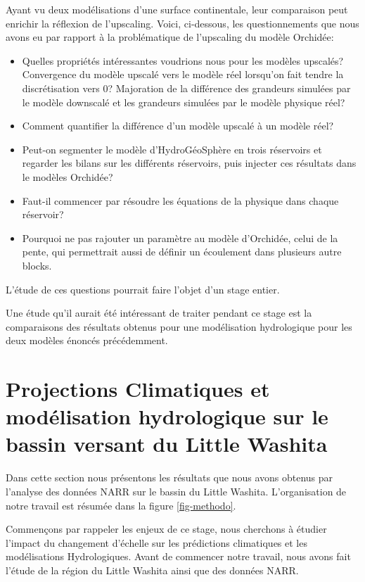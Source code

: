 \documentclass[a4paper,11pt]{article}
\numberwithin{equation}{section}
\begin{document}
Ayant vu deux modélisations d'une surface continentale, leur comparaison peut enrichir la réflexion de l'upscaling. Voici, ci-dessous, les questionnements que nous avons eu par rapport à la problématique de l'upscaling du modèle Orchidée:

\begin{itemize}
	\item Quelles propriétés intéressantes voudrions nous pour les modèles upscalés? 
	\subitem Convergence du modèle upscalé vers le modèle réel lorsqu'on fait tendre la discrétisation vers $0$? 
	\subitem Majoration de la différence des grandeurs simulées par le modèle downscalé et les grandeurs simulées par le modèle physique réel?   
	\item Comment quantifier la différence d'un modèle upscalé à un modèle réel?
	\item Peut-on segmenter le modèle d'HydroGéoSphère en trois réservoirs et regarder les bilans sur les différents réservoirs, puis injecter ces résultats dans le modèles Orchidée?
	\item Faut-il commencer par résoudre les équations de la physique dans chaque réservoir? \item Pourquoi ne pas rajouter un paramètre au modèle d'Orchidée, celui de la pente, qui permettrait aussi de définir un écoulement dans plusieurs autre blocks.
\end{itemize}

L'étude de ces questions pourrait faire l'objet d'un stage entier. 

\vspace{0.7 cm}

Une étude qu'il aurait été intéressant de traiter pendant ce stage est la comparaisons des résultats obtenus pour une modélisation hydrologique pour les deux modèles énoncés précédemment.
 
\newpage
\section{Projections Climatiques et modélisation hydrologique sur le bassin versant du Little Washita}

\label{ch:proj-climatique-mod-hydro}

Dans cette section nous présentons les résultats que nous avons obtenus par l'analyse des données NARR sur le bassin du Little Washita. L'organisation de notre travail est résumée dans la figure \ref{fig-methodo}.

Commençons par rappeler les enjeux de ce stage, nous cherchons à étudier l'impact du changement d'échelle sur les prédictions climatiques et les modélisations Hydrologiques. Avant de commencer notre travail, nous avons fait l'étude de la région du Little Washita ainsi que des données NARR.
\end{document}
